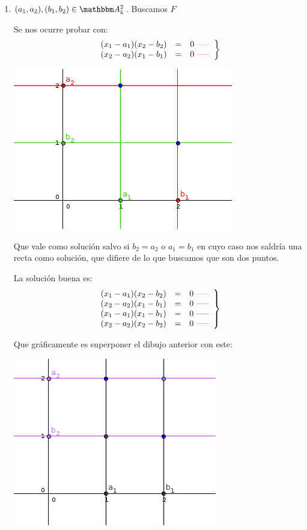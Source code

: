 \begin{example}
\begin{enumerate}
		\item $(a_1,a_2),(b_1,b_2) \in \A^2_k$. Buscamos $F$

		Se nos ocurre probar con:
		\[
		\left.
		\begin{array}{rcl}
		(x_1-a_1)(x_2-b_2) & = & 0  \text{ \textcolor{green}{-----}}\\
		(x_2-a_2)(x_1-b_1) & = & 0 \text{ \textcolor{red}{-----}}
		\end{array}
		\right\}
		\]

		\begin{center}
			\includegraphics[scale=0.45]{img/ej3.png}
		\end{center}

		Que vale como solución salvo si $b_2=a_2$ o $a_1=b_1$ en cuyo caso nos saldría una recta como solución, que difiere de lo que buscamos que son dos puntos.

		La solución buena es:
		\[
		\left.
		\begin{array}{rcl}
		(x_1-a_1)(x_2-b_2) & = & 0 \text{ \textcolor{green}{-----}}\\
		(x_2-a_2)(x_1-b_1) & = & 0 \text{ \textcolor{red}{-----}}\\
		(x_1-a_1)(x_1-b_1) & = & 0 \text{ \textcolor{black}{-----}}\\
		(x_2-a_2)(x_2-b_2) & = & 0 \text{ \textcolor{purple}{-----}}
		\end{array}
		\right\}
		\]

		Que gráficamente es superponer el dibujo anterior con este:

		\begin{center}
			\includegraphics[scale=0.45]{img/ej4.png}
		\end{center}


\end{enumerate}
\end{example}
